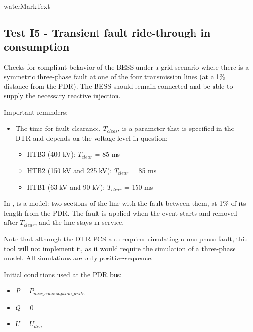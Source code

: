     {{ waterMarkText }}

    \renewcommand{\DTRPcs}{ThreePhaseFault} %
    \renewcommand{\PCSname}{PCS_RTE-I16z3}
    \renewcommand{\OCname}{TransientBoltedConsumption}


    \subsection{Test I5 - Transient fault ride-through in consumption}

    Checks for compliant behavior of the BESS under a grid scenario where there
    is a symmetric three-phase fault at one of the four transmission lines
    (at a 1\% distance from the PDR). The BESS should remain connected and
    be able to supply the necessary reactive injection.

    \GridCircuitZthree

    \noindent Important reminders:
    \begin{itemize}
        \item The time for fault clearance, $T_{clear}$, is a parameter that
        is specified in the DTR and depends on the voltage level in
        question:
        \begin{itemize}
            \item HTB3 (400 kV): $T_{clear}$ = 85 ms
            \item HTB2 (150 kV and 225 kV): $T_{clear}$ = 85 ms
            \item HTB1 (63 kV and 90 kV): $T_{clear}$ = 150 ms
        \end{itemize}
    \end{itemize}

    In \Dynawo{},  is a  model: two sections of the
    line with the fault between them, at 1\% of its length from the PDR. The
    fault is applied when the event starts and removed after $T_{clear}$, and the
    line stays in service.

    Note that although the DTR PCS also requires simulating a one-phase
    fault, this tool will not implement it, as it would require the
    simulation of a three-phase model. All simulations are only
    positive-sequence.

    \begin{description}
        \item Initial conditions used at the PDR bus:
        \begin{itemize}
            \item $P = P_{max\_consumption\_unite}$
            \item $Q = 0$
            \item $U = U_{dim}$
        \end{itemize}
    \end{description}

